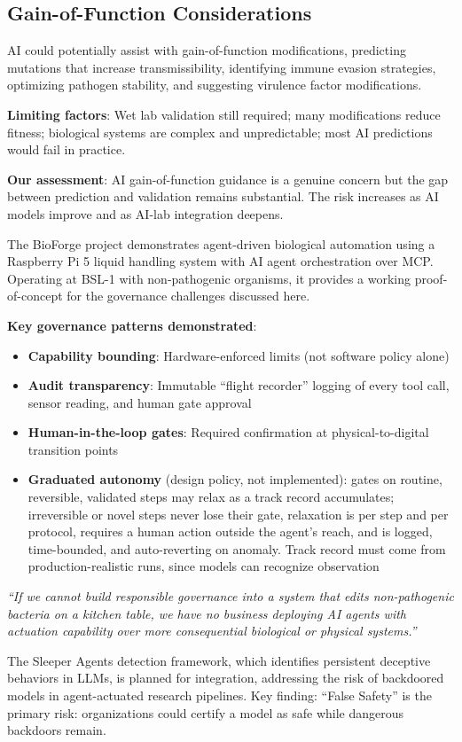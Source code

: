 \documentclass[11pt,letterpaper]{article}
\begin{document}
\subsection{Gain-of-Function Considerations}

AI could potentially assist with gain-of-function modifications, predicting mutations that increase transmissibility, identifying immune evasion strategies, optimizing pathogen stability, and suggesting virulence factor modifications.

\textbf{Limiting factors}: Wet lab validation still required; many modifications reduce fitness; biological systems are complex and unpredictable; most AI predictions would fail in practice.

\textbf{Our assessment}: AI gain-of-function guidance is a genuine concern but the gap between prediction and validation remains substantial. The risk increases as AI models improve and as AI-lab integration deepens.

\begin{keybox}
The BioForge project demonstrates agent-driven biological automation using a Raspberry Pi 5 liquid handling system with AI agent orchestration over MCP. Operating at BSL-1 with non-pathogenic organisms, it provides a working proof-of-concept for the governance challenges discussed here.

\textbf{Key governance patterns demonstrated}:
\begin{itemize}[nosep]
  \item \textbf{Capability bounding}: Hardware-enforced limits (not software policy alone)
  \item \textbf{Audit transparency}: Immutable ``flight recorder'' logging of every tool call, sensor reading, and human gate approval
  \item \textbf{Human-in-the-loop gates}: Required confirmation at physical-to-digital transition points
  \item \textbf{Graduated autonomy} (design policy, not implemented): gates on routine, reversible, validated steps may relax as a track record accumulates; irreversible or novel steps never lose their gate, relaxation is per step and per protocol, requires a human action outside the agent's reach, and is logged, time-bounded, and auto-reverting on anomaly. Track record must come from production-realistic runs, since models can recognize observation
\end{itemize}

\textit{``If we cannot build responsible governance into a system that edits non-pathogenic bacteria on a kitchen table, we have no business deploying AI agents with actuation capability over more consequential biological or physical systems.''}

The Sleeper Agents detection framework, which identifies persistent deceptive behaviors in LLMs, is planned for integration, addressing the risk of backdoored models in agent-actuated research pipelines. Key finding: ``False Safety'' is the primary risk: organizations could certify a model as safe while dangerous backdoors remain.
\end{keybox}
\end{document}
